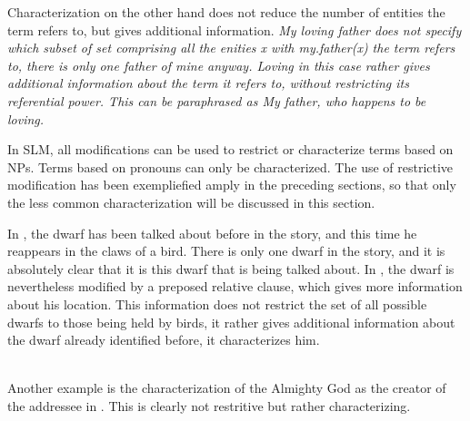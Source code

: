 Characterization on the other hand does not reduce the number of entities the term refers to, but gives additional information. \em My loving father \em does not specify which subset of set comprising all the enities x with my.father(x)   the term refers to, there is only one father of mine anyway. \em Loving \em in this case rather gives additional information about the term it refers to, without restricting its referential power. This can be paraphrased as \em My father, who happens to be loving.\em

In SLM, all modifications can be used to restrict or characterize terms based on NPs. Terms based on pronouns can only be characterized. The use of restrictive modification has been exempliefied amply in the preceding sections, so that only the less common characterization will be discussed in this section.

In , the dwarf has been talked about before in the story, and this time he reappears in the claws of a bird. There is only one dwarf in the story, and it is absolutely clear that it is this dwarf that is being talked about. In , the dwarf is nevertheless modified by  a preposed relative clause, which gives more information about his location. This information does not restrict the set of all possible dwarfs to those being held by birds, it rather gives additional information about the dwarf already identified before, it characterizes him.


 \\
Another example is the characterization of the Almighty God as the creator of the addressee in . This is clearly not restritive but rather characterizing.



 \\

